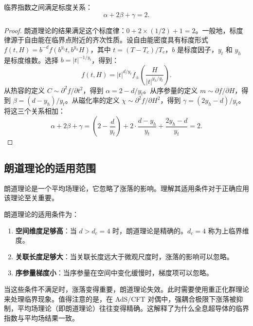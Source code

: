 \begin{theorem}
临界指数之间满足标度关系：
\begin{equation}
    \alpha + 2\beta + \gamma = 2.
\end{equation}
\end{theorem}

\begin{proof}
朗道理论的结果满足这个标度律：$0 + 2 \times (1/2) + 1 = 2$。一般地，标度律源于自由能在临界点附近的齐次性质。设自由能密度具有标度形式 $f(t, H) = b^{-d} f(b^{y_t} t, b^{y_h} H)$，其中 $t = (T - T_c)/T_c$，$b$ 是标度因子，$y_t$ 和 $y_h$ 是标度维数。选择 $b = |t|^{-1/y_t}$，得到：
\begin{equation}
    f(t, H) = |t|^{d/y_t} f_\pm\left(\frac{H}{|t|^{y_h/y_t}}\right).
\end{equation}
从热容的定义 $C \sim \partial^2 f/\partial t^2$，得到 $\alpha = 2 - d/y_t$。从序参量的定义 $m \sim \partial f/\partial H$，得到 $\beta = (d - y_h)/y_t$。从磁化率的定义 $\chi \sim \partial^2 f/\partial H^2$，得到 $\gamma = (2y_h - d)/y_t$。将这三个关系相加：
\begin{equation}
    \alpha + 2\beta + \gamma = \left(2 - \frac{d}{y_t}\right) + 2\cdot\frac{d - y_h}{y_t} + \frac{2y_h - d}{y_t} = 2.
\end{equation}
\end{proof}

\subsection{朗道理论的适用范围}

\begin{note}
朗道理论是一个平均场理论，它忽略了涨落的影响。理解其适用条件对于正确应用该理论至关重要。
\end{note}

\begin{theorem}[上临界维度]
朗道理论的适用条件为：
\begin{enumerate}
    \item \textbf{空间维度足够高}：当 $d > d_c = 4$ 时，朗道理论是精确的。$d_c = 4$ 称为上临界维度。
    \item \textbf{关联长度足够大}：当关联长度远大于微观尺度时，涨落的影响可以忽略。
    \item \textbf{序参量梯度小}：当序参量在空间中变化缓慢时，梯度项可以忽略。
\end{enumerate}
\end{theorem}

\begin{remark}
当这些条件不满足时，涨落变得重要，朗道理论失效。此时需要使用重正化群理论来处理临界现象。值得注意的是，在 AdS/CFT 对偶中，强耦合极限下涨落被抑制，平均场理论（即朗道理论）往往变得精确。这解释了为什么全息超导体的临界指数与平均场结果一致。
\end{remark}

